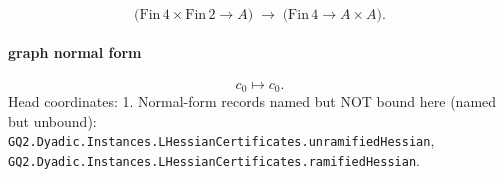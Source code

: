 \[\bigl(\mathrm{Fin}\,4\times\mathrm{Fin}\,2\to A\bigr)\;\longrightarrow\;\bigl(\mathrm{Fin}\,4\to A\times A\bigr).\]
\paragraph{graph normal form}
\[c_0\mapsto c_0.\]
Head coordinates: 1. Normal-form records named but NOT bound here (named but unbound): \texttt{GQ2.Dyadic.Instances.LHessianCertificates.unramifiedHessian}, \texttt{GQ2.Dyadic.Instances.LHessianCertificates.ramifiedHessian}.
